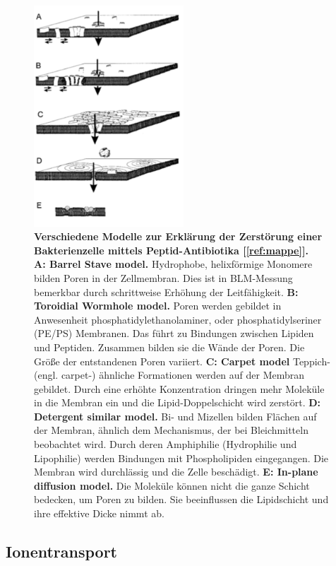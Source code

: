 \documentclass[a4paper,ngerman]{scrartcl}
\begin{document}
\begin{figure}[tb!]
\includegraphics[width=0.5\textwidth]{abbildungen/wirkmechanismus.png}
\caption{\textbf{Verschiedene Modelle zur Erklärung der Zerstörung einer Bakterienzelle mittels Peptid-Antibiotika [\ref{ref:mappe}].}\\
\textbf{A: Barrel Stave model.} 
Hydrophobe, helixförmige Monomere bilden Poren in der Zellmembran. 
Dies ist in BLM-Messung bemerkbar durch schrittweise Erhöhung der Leitfähigkeit.
\textbf{B: Toroidial Wormhole model.}  
Poren werden gebildet in Anwesenheit phosphatidylethanolaminer, oder phosphatidylseriner (PE/PS) Membranen. 
Das führt zu Bindungen zwischen Lipiden und Peptiden.
Zusammen bilden sie die Wände der Poren.
Die Größe der entstandenen Poren variiert.
\textbf{C: Carpet model}  
Teppich-(engl. carpet-) ähnliche Formationen werden auf der Membran gebildet.
Durch eine erhöhte Konzentration dringen mehr Moleküle in die Membran ein und die Lipid-Doppelschicht wird zerstört.
\textbf{D:  Detergent similar model.}
Bi- und Mizellen bilden Flächen auf der Membran, ähnlich dem Mechanismus, der bei Bleichmitteln beobachtet wird.
Durch deren Amphiphilie (Hydrophilie und Lipophilie) werden Bindungen mit Phospholipiden eingegangen.
Die Membran wird durchlässig und die Zelle beschädigt.
\textbf{E:  In-plane diffusion model.}
Die Moleküle können nicht die ganze Schicht bedecken, um Poren zu bilden. 
Sie beeinflussen die Lipidschicht und ihre effektive Dicke nimmt ab.
}
\label{fig:wirkmechanismus}
\end{figure}


\subsection{Ionentransport}
\end{document}

